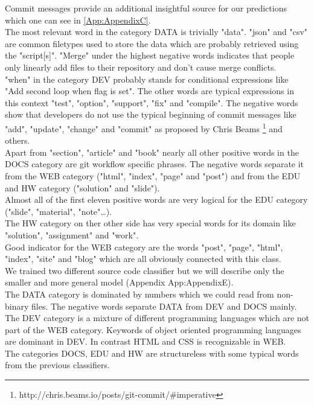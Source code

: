 \documentclass[%
a4paper,
DIV12,
2.5headlines,
bigheadings,
titlepage,
openbib,
]{scrartcl}
\begin{document}
Commit messages provide an additional insightful source for our predictions which one can see in \ref{App:AppendixC}.\\
The most relevant word in the category DATA is trivially "data".
"json" and "csv" are common filetypes used to store the data which are probably retrieved using the "script[s]".
"Merge" under the highest negative words indicates that people only linearly add files to their repository and don't cause merge conflicts.\\
"when" in the category DEV probably stands for conditional expressions like "Add second loop when flag is set".
The other words are typical expressions in this context "test", "option", "support", "fix" and "compile".
The negative words show that developers do not use the typical beginning of commit messages like "add", "update", "change" and "commit" as proposed by Chris Beams \footnote{http://chris.beams.io/posts/git-commit/\#imperative} and others.\\
Apart from "section", "article" and "book" nearly all other positive words in the DOCS category are git workflow specific phrases.
The negative words separate it from the WEB category ("html", "index", "page" and "post") and from the EDU and HW category ("solution" and "slide").\\
Almost all of the first eleven positive words are very logical for the EDU category ("slide", "material", "note"\dots).\\
The HW category on ther other side has very special words for its domain like "solution", "assignment" and "work".\\
Good indicator for the WEB category are the words "post", "page", "html", "index", "site" and "blog" which are all obviously connected with this class.\\

We trained two different source code classifier but we will describe only the smaller and more general model (Appendix App:AppendixE).\\
The DATA category is dominated by numbers which we could read from non-binary files.
The negative words separate DATA from DEV and DOCS mainly.\\
The DEV category is a mixture of different programming languages which are not part of the WEB category.
Keywords of object oriented programming languages are dominant in DEV.
In contrast HTML and CSS is recognizable in WEB.\\
The categories DOCS, EDU and HW are structureless with some typical words from the previous classifiers.
\end{document}
